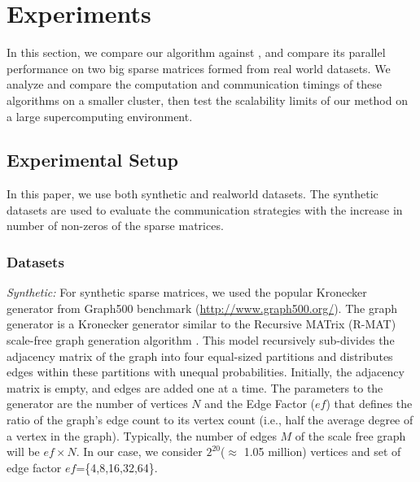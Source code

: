 \section{Experiments}
\label{sec:experiment}
\newcommand{\NLS}{LUC }


In this section, we compare our algorithm \distspnmf against \mpifaun, and compare its parallel performance on two big sparse matrices formed from real world datasets.
We analyze and compare the computation and communication timings of these algorithms on a smaller cluster, then test the scalability limits of our method on a large supercomputing environment.

\subsection{Experimental Setup}
In this paper, we use both synthetic and realworld datasets. The synthetic datasets are used to evaluate the communication
 strategies with the increase in number of non-zeros of the sparse matrices. 
\subsubsection{Datasets}\label{sec:datasets}


{\em Synthetic:} For synthetic sparse matrices, we used the popular Kronecker generator from Graph500 benchmark (\url{http://www.graph500.org/}). The graph generator is a Kronecker generator similar to the Recursive MATrix (R-MAT) scale-free graph generation algorithm \cite{CZF04}. This model recursively sub-divides the adjacency matrix of the graph into four equal-sized partitions and distributes edges within these partitions with unequal probabilities. Initially, the adjacency matrix is empty, and edges are added one at a time. The parameters to the generator are the number of vertices $N$ and the Edge Factor ($ef$) that defines the ratio of the graph's edge count to its vertex count (i.e., half the average degree of a vertex in the graph). Typically, the number of edges $M$ of the scale free graph will be $ef \times N$. In our case, we consider $2^{20}$($\approx$ 1.05 million) vertices and set of edge factor $ef$=\{4,8,16,32,64\}.  

